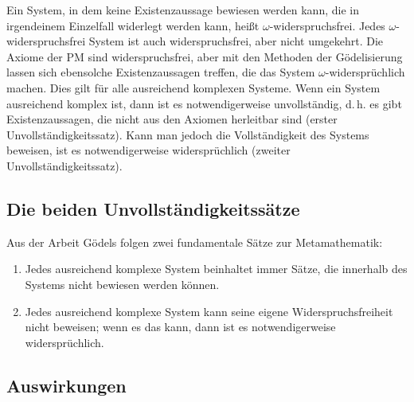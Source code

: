 Ein System, in dem keine Existenzaussage bewiesen werden kann, die in irgendeinem
Einzelfall widerlegt werden kann, heißt $\omega$-widerspruchsfrei. Jedes 
$\omega$-widerspruchsfrei System ist auch widerspruchsfrei, aber nicht umgekehrt.
Die Axiome der PM sind widerspruchsfrei, aber mit den Methoden der Gödelisierung
lassen sich ebensolche Existenzaussagen treffen, die das System $\omega$-widersprüchlich
machen. Dies gilt für alle ausreichend komplexen
Systeme. Wenn ein System ausreichend komplex ist, dann ist es notwendigerweise unvollständig,
d.\,h. es gibt Existenzaussagen, die nicht aus den Axiomen herleitbar sind (erster
Unvollständigkeitssatz). Kann man jedoch die
Vollständigkeit des Systems beweisen, ist es notwendigerweise widersprüchlich 
(zweiter Unvollständigkeitssatz).

\subsection*{Die beiden Unvollständigkeitssätze}

Aus der Arbeit Gödels folgen zwei fundamentale Sätze zur Metamathematik:

\begin{enumerate}
	\item Jedes ausreichend komplexe System beinhaltet immer Sätze, die innerhalb
		des Systems nicht bewiesen werden können.
	\item Jedes ausreichend komplexe System kann seine eigene Widerspruchsfreiheit
		nicht beweisen; wenn es das kann, dann ist es
		notwendigerweise widersprüchlich.
\end{enumerate}

\subsection*{Auswirkungen}

